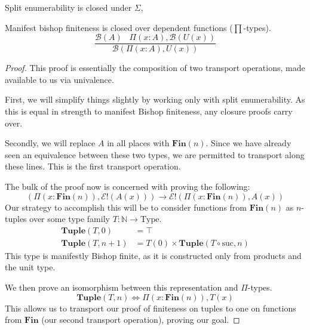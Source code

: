 \begin{romlemma}
  Split enumerability is closed under \(\Sigma\),
\end{romlemma}
\begin{romlemma}
  Manifest bishop finiteness is closed over dependent functions
  (\(\prod\)-types).
  \begin{equation}
    \frac{
      \mathcal{B}(A) \; \; \; \Pi {(x : A)} , \mathcal{B}\left( U(x) \right)
    }{
      \mathcal{B}\left(\Pi {(x : A)} , U(x)\right)
    }
  \end{equation}
\end{romlemma}
\begin{proof}
  This proof is essentially the composition of two transport operations, made
  available to us via univalence.
  
  First, we will simplify things slightly by working only with split
  enumerability.
  As this is equal in strength to manifest Bishop finiteness, any closure proofs
  carry over.

  Secondly, we will replace \(A\) in all places with \(\mathbf{Fin}(n)\).
  Since we have already seen an equivalence between these two types, we are
  permitted to transport along these lines.
  This is the first transport operation.

  The bulk of the proof now is concerned with proving the following:
  \begin{equation}
    \left( \Pi {(x : \mathbf{Fin}(n))} , \mathcal{E}!(A(x)) \right) \rightarrow \mathcal{E}!\left( \Pi {(x : \mathbf{Fin}(n))} , A(x) \right)
  \end{equation}
  Our strategy to accomplish this will be to consider functions from
  \(\mathbf{Fin}(n)\) as \(n\)-tuples over some type family \(T : \mathbb{N}
  \rightarrow \text{Type}\).
  \begin{equation}
    \begin{aligned}
      \mathbf{Tuple}(T, 0)   &= \top \\
      \mathbf{Tuple}(T, n+1) &= T(0) \times \mathbf{Tuple}(T \circ \text{suc}, n)
    \end{aligned}
  \end{equation}
  This type is manifestly Bishop finite, as it is constructed only from products
  and the unit type.
  
  We then prove an isomorphism between this representation and \(\Pi\)-types.
  \begin{equation}
    \mathbf{Tuple}(T, n) \iff \Pi {(x : \mathbf{Fin}(n))} , T(x)
  \end{equation}
  This allows us to transport our proof of finiteness on tuples to one on
  functions from \(\mathbf{Fin}\) (our second transport operation), proving our
  goal.
\end{proof}
